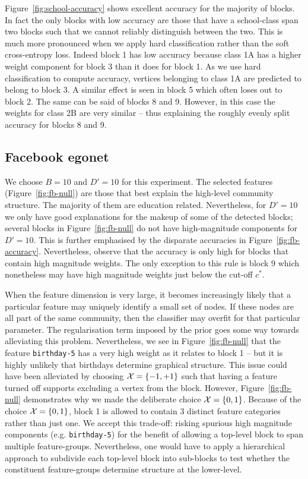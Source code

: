Figure~\ref{fig:school-accuracy} shows excellent accuracy for the majority of blocks. In fact the only blocks with low accuracy are those that have a school-class span two blocks such that we cannot reliably distinguish between the two. This is much more pronounced when we apply hard classification rather than the soft cross-entropy loss. Indeed block 1 has low accuracy because class 1A has a higher weight component for block 3 than it does for block 1. As we use hard classification to compute accuracy, vertices belonging to class 1A are predicted to belong to block 3. A similar effect is seen in block 5 which often loses out to block 2. The same can be said of blocks 8 and 9. However, in this case the weights for class 2B are very similar -- thus explaining the roughly evenly split accuracy for blocks 8 and 9.

\subsection{Facebook egonet}

We choose $B=10$ and $D'=10$ for this experiment. The selected features 
(Figure~\ref{fig:fb-null}) are those that best explain the high-level 
community structure. The majority of them are education related. 
Nevertheless, for $D'=10$ we only have good explanations for the makeup 
of some of the detected blocks; several blocks in 
Figure~\ref{fig:fb-null} do not have high-magnitude components for $D'=10$. This is further emphasised by the disparate accuracies in Figure~\ref{fig:fb-accuracy}. Nevertheless, observe that the accuracy is only high for blocks that contain high magnitude weights. The only exception to this rule is block 9 which nonetheless may have high magnitude weights just below the cut-off $c^*$.

When the feature dimension is very large, it becomes increasingly likely that 
a particular feature may uniquely identify a small set of nodes. If these nodes 
are all part of the same community, then the classifier may overfit for that 
particular parameter. The regularisation term imposed by the prior goes some 
way towards alleviating this problem. Nevertheless, we see in 
Figure~\ref{fig:fb-null} that the feature \verb*|birthday-5| has a very 
high weight as it relates to block 1 -- but it is highly unlikely
that birthdays determine graphical structure. This issue could have been alleviated by 
choosing $\mathcal{X}=\{-1, +1\}$ such that having a feature turned off supports excluding 
a vertex from the block. However, Figure~\ref{fig:fb-null} demonstrates why we made 
the deliberate choice $\mathcal{X}=\{0,1\}$. 
Because of the choice $\mathcal{X}=\{0,1\}$, block 1 is allowed to contain 3 distinct feature 
categories rather than just one. We accept this trade-off: risking spurious high magnitude 
components (e.g. \verb*|birthday-5|) for the benefit of allowing a top-level block to span 
multiple feature-groups. Nevertheless, one would have to apply a hierarchical approach 
to subdivide each top-level block into sub-blocks to test whether the constituent 
feature-groups determine structure at the lower-level.